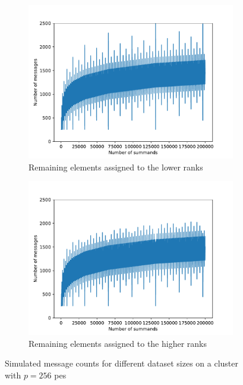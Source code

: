 \begin{figure}
\centering
\begin{subfigure}{0.7\textwidth}
\centering
\includegraphics[scale=0.7]{figures/message_count_256.pdf}
\caption{Remaining elements assigned to the lower ranks}
\label{fig:messageCount256}
\end{subfigure}
\hfill
\begin{subfigure}{0.7\textwidth}
\centering
\includegraphics[scale=0.7]{figures/message_count_256_remainder_at_end.pdf}
\caption{Remaining elements assigned to the higher ranks}
\label{fig:messageCount256RemainderAtEnd}
\end{subfigure}

\caption{Simulated message counts for different dataset sizes on a cluster with $p=256$ \glspl{pe}}
\end{figure}

